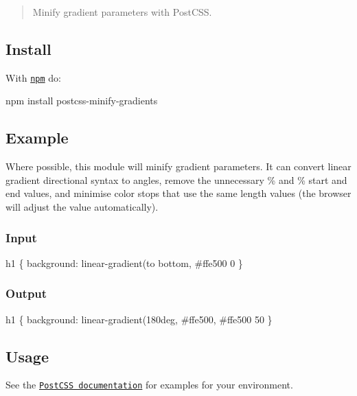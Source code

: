 \begin{quote}
Minify gradient parameters with Post\+C\+SS. \end{quote}


\subsection*{Install}

With \href{https://npmjs.org/package/postcss-minify-gradients}{\tt npm} do\+:


\begin{DoxyCode}
npm install postcss-minify-gradients
\end{DoxyCode}


\subsection*{Example}

Where possible, this module will minify gradient parameters. It can convert linear gradient directional syntax to angles, remove the unnecessary {\%} and {\%} start and end values, and minimise color stops that use the same length values (the browser will adjust the value automatically).

\subsubsection*{Input}


\begin{DoxyCode}
h1 \{
    background: linear-gradient(to bottom, #ffe500 0%
\}
\end{DoxyCode}


\subsubsection*{Output}


\begin{DoxyCode}
h1 \{
    background: linear-gradient(180deg, #ffe500, #ffe500 50%
\}
\end{DoxyCode}


\subsection*{Usage}

See the \href{https://github.com/postcss/postcss#usage}{\tt Post\+C\+SS documentation} for examples for your environment.


